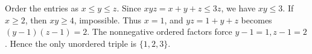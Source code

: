 Order the entries as $x\le y\le z$. Since $xyz=x+y+z\le3z$, we have $xy\le3$. If $x\ge2$, then $xy\ge4$, impossible. Thus $x=1$, and $yz=1+y+z$ becomes $(y-1)(z-1)=2$. The nonnegative ordered factors force $y-1=1,z-1=2$. Hence the only unordered triple is $\boxed{\{1,2,3\}}$.
